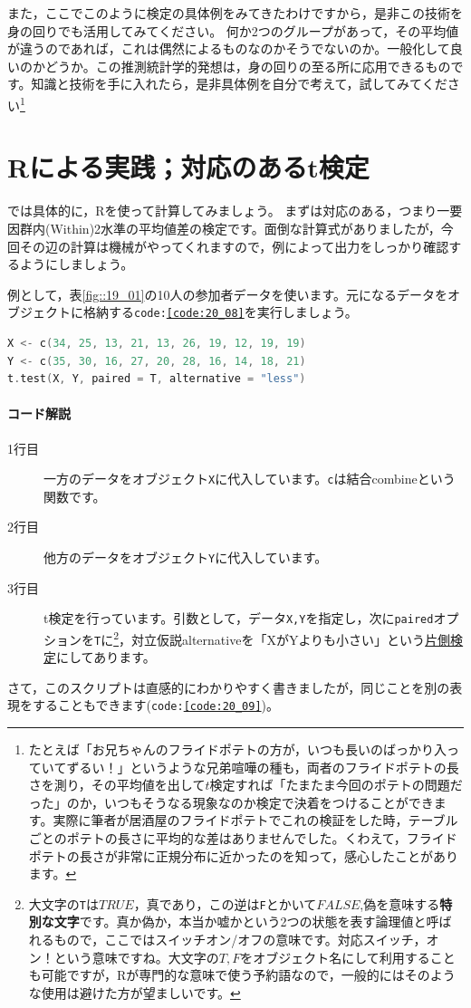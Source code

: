 \documentclass{ltjsbook}
\begin{document}
また，ここでこのように検定の具体例をみてきたわけですから，是非この技術を身の回りでも活用してみてください。
何か2つのグループがあって，その平均値が違うのであれば，これは偶然によるものなのかそうでないのか。一般化して良いのかどうか。この推測統計学的発想は，身の回りの至る所に応用できるものです。知識と技術を手に入れたら，是非具体例を自分で考えて，試してみてください\footnote{たとえば「お兄ちゃんのフライドポテトの方が，いつも長いのばっかり入っていてずるい！」というような兄弟喧嘩の種も，両者のフライドポテトの長さを測り，その平均値を出して$t$検定すれば「たまたま今回のポテトの問題だった」のか，いつもそうなる現象なのか検定で決着をつけることができます。実際に筆者が居酒屋のフライドポテトでこれの検証をした時，テーブルごとのポテトの長さに平均的な差はありませんでした。くわえて，フライドポテトの長さが非常に正規分布に近かったのを知って，感心したことがあります。}


\section{Rによる実践；対応のあるt検定}
では具体的に，Rを使って計算してみましょう。
まずは対応のある，つまり一要因群内(Within)2水準の平均値差の検定です。面倒な計算式がありましたが，今回その辺の計算は機械がやってくれますので，例によって出力をしっかり確認するようにしましょう。

例として，表\ref{fig::19_01}の10人の参加者データを使います。元になるデータをオブジェクトに格納する\texttt{code:\ref{code:20_08}}を実行しましょう。
\begin{lstlisting}[language=c++,label={code:20_08},caption={t検定を行う}]
X <- c(34, 25, 13, 21, 13, 26, 19, 12, 19, 19)
Y <- c(35, 30, 16, 27, 20, 28, 16, 14, 18, 21)
t.test(X, Y, paired = T, alternative = "less")
\end{lstlisting}

\paragraph{コード解説}
\begin{description}
	\item[1行目] 一方のデータをオブジェクト\texttt{X}に代入しています。\texttt{c}は結合combineという関数です。
	\item[2行目] 他方のデータをオブジェクト\texttt{Y}に代入しています。
	\item[3行目] t検定を行っています。引数として，データ\texttt{X,Y}を指定し，次に\texttt{paired}オプションを\texttt{T}に\footnote{大文字の\texttt{T}は$TRUE$，真であり，この逆は\texttt{F}とかいて$FALSE$,偽を意味する\textbf{特別な文字}です。真か偽か，本当か嘘かという2つの状態を表す論理値と呼ばれるもので，ここではスイッチオン/オフの意味です。対応スイッチ，オン！という意味ですね。大文字の$T,F$をオブジェクト名にして利用することも可能ですが，Rが専門的な意味で使う予約語なので，一般的にはそのような使用は避けた方が望ましいです。}，対立仮説alternativeを「XがYよりも小さい」という\underline{片側検定}にしてあります。
\end{description}
さて，このスクリプトは直感的にわかりやすく書きましたが，同じことを別の表現をすることもできます(\texttt{code:\ref{code:20_09}})。
\end{document}
